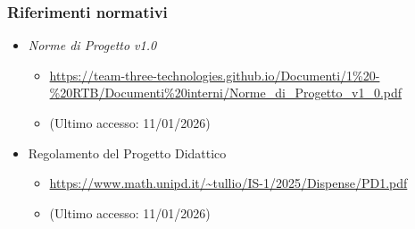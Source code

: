 \documentclass[a4paper,12pt]{article}
\begin{document}
        \subsubsection{Riferimenti normativi}
            \begin{itemize}
                \item \textit{Norme di Progetto v1.0}
                \begin{itemize}
                    \item \url{https://team-three-technologies.github.io/Documenti/1%20-%20RTB/Documenti%20interni/Norme_di_Progetto_v1_0.pdf}
                    \item[] (Ultimo accesso: 11/01/2026)
                \end{itemize}
                \item Regolamento del Progetto Didattico
                \begin{itemize}
                    \item \url{https://www.math.unipd.it/~tullio/IS-1/2025/Dispense/PD1.pdf}
                    \item[] (Ultimo accesso: 11/01/2026)
                \end{itemize}
            \end{itemize}
\end{document}
